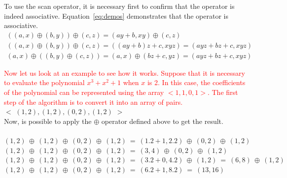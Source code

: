 \documentclass[Ingles]{ic-tese-v1}
\newcommand{\ed}[1]{\noindent\textcolor{red}{ {#1}}}
\newcommand{\ed}[1]{}
\newcommand{\req}[1]{Equation~\ref{eq:#1}}
\begin{document}
To use the scan operator, it is  necessary first to confirm that the operator is indeed associative. 
\req{demos}  demonstrates that the operator is associative.
\begin{equation}
\begin{split}
((a, x) \oplus (b, y)) \oplus (c, z) = (a y + b, x y) \oplus (c, z) \\
((a, x) \oplus (b, y)) \oplus (c, z) = ((a y + b) z + c, x y z) = (a y z + b z + c, x y z)\\
(a, x) \oplus ((b, y) \oplus (c, z)) = (a, x) \oplus (b z + c, y z) = (a y z + b z + c, x y z)
\end{split}
\label{eq:demos}
\end{equation}

\ed{ Now let us look at an example to see how it works. Suppose that it is necessary to evaluate the
polynomial $x^{3} + x^{2} + 1$ when $x$ is 2. In this case, the coefficients of the
polynomial can be represented using the array $<1, 1, 0, 1>$. The first step of the
algorithm is to convert it into an array of pairs.}\\

$<$ $(1, 2), (1, 2), (0, 2), (1, 2)$ $>$\\

Now, is possible to apply the $\oplus$ operator defined above to get the result.\\\\
$(1, 2)\:\oplus\:(1, 2)\:\oplus\:(0, 2)\:\oplus\:(1, 2)\:=\:(1 . 2 + 1, 2 . 2)\:\oplus\:(0, 2)\: \oplus\:(1, 2)$\\
$(1, 2)\:\oplus\:(1, 2)\:\oplus\:(0, 2)\:\oplus\:(1, 2)\:=\:(3, 4)\:\oplus\:(0, 2)\:\oplus\:(1, 2)$\\
$(1, 2)\:\oplus\:(1, 2)\:\oplus\:(0, 2)\:\oplus\:(1, 2)\:=\:(3. 2 + 0, 4 . 2)\:\oplus\:(1, 2)\:=\:(6, 8)\:\oplus\:(1, 2)$\\
$(1, 2)\:\oplus\:(1, 2)\:\oplus\:(0, 2)\:\oplus\:(1, 2)\:=\:(6 . 2 + 1, 8 . 2) \:=\:(13, 16)$\\\\
\end{document}
